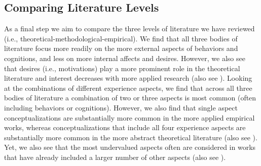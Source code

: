 \color{blue}
\subsection{Comparing Literature Levels}
\color{black}

As a final step we aim to compare the three levels of literature we have
reviewed (i.e., theoretical-methodological-empirical). We find that all
three bodies of literature focus more readily on the more external
aspects of behaviors and cognitions, and less on more internal affects
and desires. However, we also see that desires (i.e., motivations) play
a more prominent role in the theoretical literature and interest
decreases with more applied research (also see
). Looking at the combinations of
different experience aspects, we find that across all three bodies of
literature a combination of two or three aspects is most common (often
including behaviors or cognitions). However, we also find that single
aspect conceptualizations are substantially more common in the more
applied empirical works, whereas conceptualizations that include all
four experience aspects are substantially more common in the more
abstract theoretical literature (also see
). Yet, we also see that the most
undervalued aspects often are considered in works that have already
included a larger number of other aspects (also see
).

\color{black}

